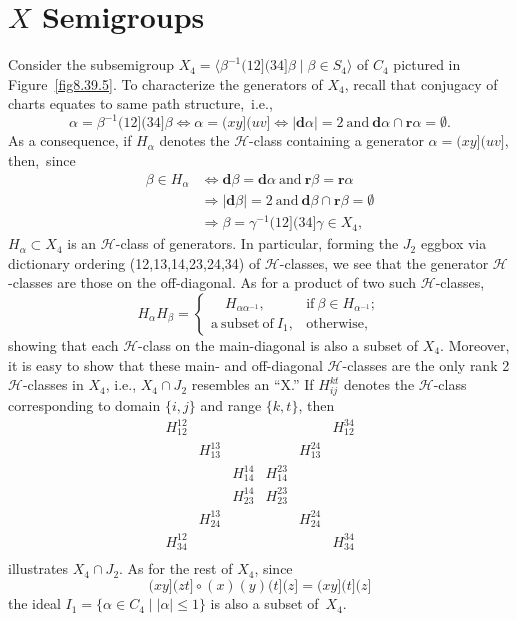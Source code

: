\documentclass{surv-l}
\numberwithin{equation}{section}
\numberwithin{table}{section}
\numberwithin{figure}{section}
\theoremstyle{definition}
\begin{document}
\section{$X$ Semigroups}\label{sec7.29}

Consider the subsemigroup
$X_{4}=\langle\beta^{-1}(12](34]\beta \mid \beta\in S_{4}\rangle$ of
$C_{4}$ pictured in Figure~\ref{fig8.39.5}. To characterize the
generators of $X_{4}$, recall that conjugacy of charts equates to
same path structure,~i.e.,
\[
\alpha=\beta^{-1}(12](34]\beta\Leftrightarrow\alpha=(xy](uv]\Leftrightarrow|\mathbf{d}\alpha|=2\
\mathrm{and}\ \mathbf{d}\alpha\cap \mathbf{r}\alpha=\emptyset.
\]
As a consequence, if $H_{\alpha}$ denotes the $\mathcal{H}$-class
containing a generator $\alpha=(xy](uv]$, then,~since
\begin{align*}
\beta\in H_{\alpha}&\Leftrightarrow
\mathbf{d}\beta=\mathbf{d}\alpha\ \mathrm{and}\ \mathbf{r}\beta=\mathbf{r}\alpha \\
&\Rightarrow|\mathbf{d}\beta|=2\ \mathrm{and}\ \mathbf{d}\beta\cap
\mathbf{r}\beta=\emptyset \\
&\Rightarrow\beta=\gamma^{-1}(12](34]\gamma\in X_{4},
\end{align*}
$H_{\alpha}\subset X_{4}$ is an $\mathcal{H}$-class of generators.
In particular, forming the $J_{2}$ eggbox via dictionary ordering
(12,13,14,23,24,34) of $\mathcal{H}$-classes, we see that the
generator $\mathcal{H}$-classes are those on the off-diagonal. As
for a product of two such $\mathcal{H}$-classes,
\[
H_{\alpha}H_{\beta}=\begin{cases}
\quad H_{\alpha\alpha^{-1}}, &\mathrm{if}\ \beta\in H_{\alpha^{-1}};\\
\mathrm{a\ subset\ of}\ I_{1}, &\mathrm{otherwise},
\end{cases}
\]
showing that each $\mathcal{H}$-class on the main-diagonal is also
a subset of $X_{4}$. Moreover, it is easy to show that these main-
and off-diagonal $\mathcal{H}$-classes are the only rank 2
$\mathcal{H}$-classes in $X_{4}$, i.e., $X_{4}\cap J_{2}$
resembles an ``X.'' If $H_{ij}^{kt}$ denotes the
$\mathcal{H}$-class corresponding to domain $\{i,j\}$ and range
$\{k, t\}$, then
\[
\begin{matrix}
H_{12}^{12} & & & & &H_{12}^{34} \\
&H_{13}^{13} & & &H_{13}^{24} & \\
&&H_{14}^{14} &H_{14}^{23} & & \\
&&H_{23}^{14} &H_{23}^{23} & & \\
&H_{24}^{13} & & &H_{24}^{24} & \\
H_{34}^{12} & & & & &H_{34}^{34} \\
\end{matrix}
\]
illustrates $X_{4}\cap J_{2}$. As for the rest of $X_{4}$, since
\[
(xy](zt]\circ(x)(y)(t](z]=(xy](t](z]
\]
the ideal $I_{1}=\{\alpha\in C_{4}\mid |\alpha|\leq 1\}$ is
also a subset of~$X_{4}$.
\end{document}
